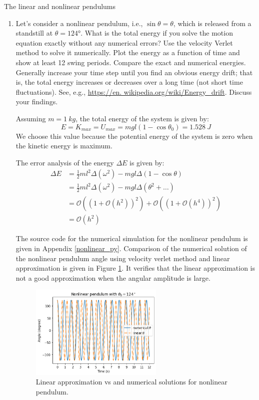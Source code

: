 \documentclass{article}
\begin{document}
\begin{section}{The linear and nonlinear pendulums}
\begin{enumerate}[1.]
	\newpage
	\item 
	Let's consider a nonlinear pendulum, i.e., $\sin \theta = \theta$, which is released from a standstill at $\theta=\ang{124}$. What is the total energy if you solve the motion equation exactly without any numerical errors? Use the velocity Verlet method to solve it numerically. Plot the energy as a function of time and show at least 12 swing periods. Compare the exact and numerical energies. Generally increase your time step until you find an obvious energy drift; that is, the total energy increases or decreases over a long time (not short time fluctuations). See, e.g., \url{https://en. wikipedia.org/wiki/Energy_drift}. Discuss your findings.
	\begin{tcolorbox}[breakable]
		Assuming $m = \SI{1}{kg}$, the total energy of the system is given by:
		\begin{equation}
			E = K_{max} = U_{max} = m g l (1-\cos{\theta_0}) = \SI{1.528}{J}
		\end{equation}
		We choose this value because the potential energy of the system is zero when the kinetic energy is maximum. 

		The error analysis of the energy $\Delta E$ is given by:
		\begin{align*}
			\Delta E 
			& = \frac{1}{2} m l^2 \Delta(\omega^2) - m g l \Delta(1-\cos{\theta}) \\
			& = \frac{1}{2} m l^2 \Delta(\omega^2) - m g l \Delta(\theta^2 + \dots) \\
			& = \mathcal{O}((1 + \mathcal{O}(h^2))^2) + \mathcal{O}((1 + \mathcal{O}(h^4))^2) \\
			& = \mathcal{O}(h^2) 
		\end{align*}

		The source code for the numerical simulation for the nonlinear pendulum is given in Appendix \ref{nonlinear_py}. Comparison of the numerical solution of the nonlinear pendulum angle using velocity verlet method and linear approximation is given in Figure \ref{fig:nonlinear_theta}. It verifies that the linear approximation is not a good approximation when the angular amplitude is large. 

		\begin{figure}[H]
			\centering
			\includegraphics[width=0.6\textwidth]{images/nonlinear_theta.png}
			\caption{Linear approximation vs and numerical solutions for nonlinear pendulum.}
			\label{fig:nonlinear_theta}	
		\end{figure}


\end{tcolorbox}
\end{enumerate}
\end{section}
\end{document}
